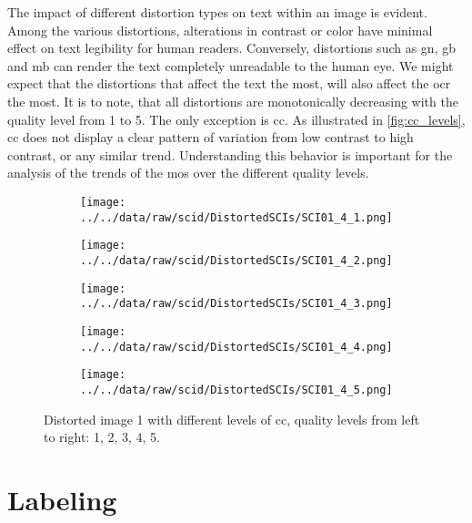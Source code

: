 The impact of different distortion types on text within an image is evident.
Among the various distortions, alterations in contrast or color have minimal effect on text legibility for human readers.
Conversely, distortions such as \gls{gn}, \gls{gb} and \gls{mb} can render the text completely unreadable to the human eye.
We might expect that the distortions that affect the text the most, will also affect the \gls{ocr} the most.
It is to note, that all distortions are monotonically decreasing with the quality level from 1 to 5.
The only exception is \gls{cc}.
As illustrated in \autoref{fig:cc_levels}, \gls{cc} does not display a clear pattern of variation from low contrast to high contrast, or any similar trend.
Understanding this behavior is important for the analysis of the trends of the \gls{mos} over the different quality levels.

\begin{figure}[h!]
    \centering
    \begin{subfigure}[b]{0.18\textwidth}
        \texttt{[image: ../../data/raw/scid/DistortedSCIs/SCI01\_4\_1.png]}
    \end{subfigure}
    \hfill
    \begin{subfigure}[b]{0.18\textwidth}
        \texttt{[image: ../../data/raw/scid/DistortedSCIs/SCI01\_4\_2.png]}
    \end{subfigure}
    \hfill
    \begin{subfigure}[b]{0.18\textwidth}
        \texttt{[image: ../../data/raw/scid/DistortedSCIs/SCI01\_4\_3.png]}
    \end{subfigure}
    \hfill
    \begin{subfigure}[b]{0.18\textwidth}
        \texttt{[image: ../../data/raw/scid/DistortedSCIs/SCI01\_4\_4.png]}
    \end{subfigure}
    \hfill
    \begin{subfigure}[b]{0.18\textwidth}
        \texttt{[image: ../../data/raw/scid/DistortedSCIs/SCI01\_4\_5.png]}
    \end{subfigure}
    \caption{Distorted image 1 with different levels of \gls{cc}, quality levels from left to right: 1, 2, 3, 4, 5.}
    \label{fig:cc_levels}
\end{figure}

\section{Labeling}
\label{sec:dataset_labeling}


